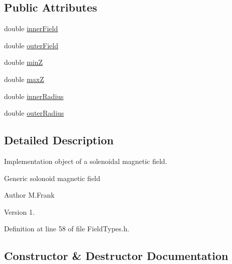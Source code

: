 \subsection*{Public Attributes}
\begin{DoxyCompactItemize}
\item 
double \hyperlink{class_d_d4hep_1_1_geometry_1_1_solenoid_field_a4f18728f3a52760c259432d4c2c6d2af}{inner\+Field}
\item 
double \hyperlink{class_d_d4hep_1_1_geometry_1_1_solenoid_field_a7a98e6f75ae53445e6b1dad2a4279ac9}{outer\+Field}
\item 
double \hyperlink{class_d_d4hep_1_1_geometry_1_1_solenoid_field_a51af6d29a975015b6f539d514ddc1000}{minZ}
\item 
double \hyperlink{class_d_d4hep_1_1_geometry_1_1_solenoid_field_aa38b5bc9144edd3b19a837c8c2473e96}{maxZ}
\item 
double \hyperlink{class_d_d4hep_1_1_geometry_1_1_solenoid_field_a76e7d98a12bae50393178361083ef37e}{inner\+Radius}
\item 
double \hyperlink{class_d_d4hep_1_1_geometry_1_1_solenoid_field_a4243bc378c9ad5c7021e9f8525691da9}{outer\+Radius}
\end{DoxyCompactItemize}


\subsection{Detailed Description}
Implementation object of a solenoidal magnetic field. 

Generic solonoid magnetic field

\begin{DoxyAuthor}{Author}
M.\+Frank 
\end{DoxyAuthor}
\begin{DoxyVersion}{Version}
1. 
\end{DoxyVersion}


Definition at line 58 of file Field\+Types.\+h.



\subsection{Constructor \& Destructor Documentation}
\hypertarget{class_d_d4hep_1_1_geometry_1_1_solenoid_field_a882732fe549f63858d40cca4c5133bf9}{}\label{class_d_d4hep_1_1_geometry_1_1_solenoid_field_a882732fe549f63858d40cca4c5133bf9} 
